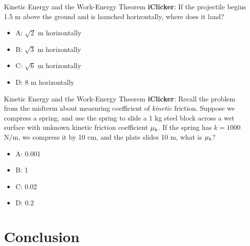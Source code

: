 \documentclass{beamer}
\begin{document}
\begin{frame}{Kinetic Energy and the Work-Energy Theorem}
\textbf{iClicker}: If the projectile begins 1.5 m above the ground and is launched horizontally, where does it land?
\begin{itemize}
\item A: $\sqrt{2}$ m horizontally
\item B: $\sqrt{3}$ m horizontally
\item C: $\sqrt{6}$ m horizontally
\item D: 8 m horizontally 
\end{itemize}
\end{frame}

\begin{frame}{Kinetic Energy and the Work-Energy Theorem}
\textbf{iClicker}: Recall the problem from the midterm about measuring coefficient of \textit{kinetic} friction.  Suppose we compress a spring, and use the spring to slide a 1 kg steel block across a wet surface with unknown kinetic friction coefficient $\mu_{\rm k}$.  If the spring has $k=1000$ N/m, we compress it by 10 cm, and the plate slides 10 m, what is $\mu_{\rm k}$?
\begin{itemize}
\item A: 0.001
\item B: 1
\item C: 0.02
\item D: 0.2 
\end{itemize}
\end{frame}

\section{Conclusion}
\end{document}
